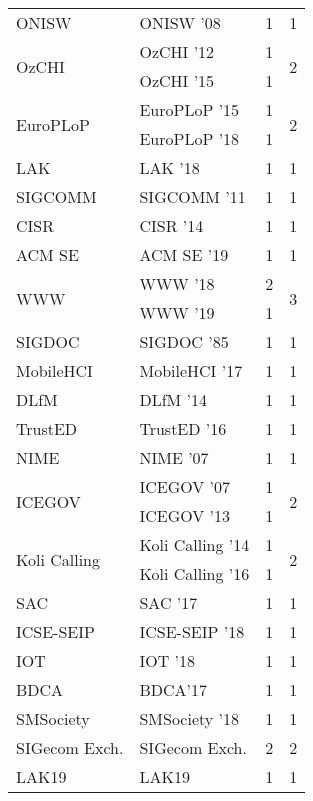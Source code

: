 \begin{table*}[t]
\begin{tabular}{llrr}
\multirow{1}{*}{ONISW } & ONISW '08 & 1 & \multirow{1}{*}{1}\\
\multirow{2}{*}{OzCHI } & OzCHI '12 & 1 & \multirow{2}{*}{2}\\
& OzCHI '15 & 1 &\\
\multirow{2}{*}{EuroPLoP } & EuroPLoP '15 & 1 & \multirow{2}{*}{2}\\
& EuroPLoP '18 & 1 &\\
\multirow{1}{*}{LAK } & LAK '18 & 1 & \multirow{1}{*}{1}\\
\multirow{1}{*}{SIGCOMM } & SIGCOMM '11 & 1 & \multirow{1}{*}{1}\\
\multirow{1}{*}{CISR } & CISR '14 & 1 & \multirow{1}{*}{1}\\
\multirow{1}{*}{ACM SE } & ACM SE '19 & 1 & \multirow{1}{*}{1}\\
\multirow{2}{*}{WWW } & WWW '18 & 2 & \multirow{2}{*}{3}\\
& WWW '19 & 1 &\\
\multirow{1}{*}{SIGDOC } & SIGDOC '85 & 1 & \multirow{1}{*}{1}\\
\multirow{1}{*}{MobileHCI } & MobileHCI '17 & 1 & \multirow{1}{*}{1}\\
\multirow{1}{*}{DLfM } & DLfM '14 & 1 & \multirow{1}{*}{1}\\
\multirow{1}{*}{TrustED } & TrustED '16 & 1 & \multirow{1}{*}{1}\\
\multirow{1}{*}{NIME } & NIME '07 & 1 & \multirow{1}{*}{1}\\
\multirow{2}{*}{ICEGOV } & ICEGOV '07 & 1 & \multirow{2}{*}{2}\\
& ICEGOV '13 & 1 &\\
\multirow{2}{*}{Koli Calling } & Koli Calling '14 & 1 & \multirow{2}{*}{2}\\
& Koli Calling '16 & 1 &\\
\multirow{1}{*}{SAC } & SAC '17 & 1 & \multirow{1}{*}{1}\\
\multirow{1}{*}{ICSE-SEIP } & ICSE-SEIP '18 & 1 & \multirow{1}{*}{1}\\
\multirow{1}{*}{IOT } & IOT '18 & 1 & \multirow{1}{*}{1}\\
\multirow{1}{*}{BDCA} & BDCA'17 & 1 & \multirow{1}{*}{1}\\
\multirow{1}{*}{SMSociety } & SMSociety '18 & 1 & \multirow{1}{*}{1}\\
\multirow{1}{*}{SIGecom Exch.} & SIGecom Exch. & 2 & \multirow{1}{*}{2}\\
\multirow{1}{*}{LAK19} & LAK19 & 1 & \multirow{1}{*}{1}\\

\end{tabular}
\end{table*}
